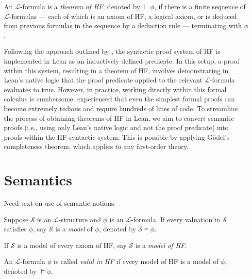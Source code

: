 \begin{definition}[Theorem of HF]
    \label{def:prf}
    An $\mathcal{L}$-formula is a \textit{theorem of HF}, denoted by $\vdash \phi$, 
    if there is a finite sequence of $\mathcal{L}$-formulas — each of which is an axiom of HF, 
    a logical axiom, or is deduced from previous formulas in the sequence by a deduction rule —
    terminating with $\phi$.
\end{definition}

Following the approach outlined by \cite{paulson2014machine}, 
the syntactic proof system of HF is implemented in Lean as an inductively defined predicate. 
In this setup, a proof within this system, resulting in a theorem of HF, 
involves demonstrating in Lean’s native logic that 
the proof predicate applied to the relevant $\mathcal{L}$-formula evaluates to true.
However, in practice, working directly within this formal calculus is cumbersome. 
\cite{paulson2014machine} experienced that even the simplest formal proofs can become extremely 
tedious and require hundreds of lines of code.
To streamline the process of obtaining theorems of HF in Lean, 
we aim to convert semantic proofs (i.e., using only Lean's native logic and not the proof predicate) 
into proofs within the HF syntactic system. 
This is possible by applying Gödel's completeness theorem, which applies to any first-order theory.

\section{Semantics}

Need text on use of semantic notions.

\begin{definition}
    \label{def:models+Model+valid}
    \leanok
    Suppose $\mathcal{S}$ is an $\mathcal{L}$-structure and $\phi$ is an $\mathcal{L}$-formula.
    If every valuation in $\mathcal{S}$ satisfies $\phi$, 
    say $\mathcal{S}$ is a \textit{model} of $\phi$, denoted by $\mathcal{S} \vDash \phi$.

    If $\mathcal{S}$ is a model of every axiom of HF, say $\mathcal{S}$ is a \textit{model of HF}.
    
    An $\mathcal{L}$-formula $\phi$ is called \textit{valid in HF} if 
    every model of HF is a model of $\phi$, denoted by $\vDash \phi$.
\end{definition}

